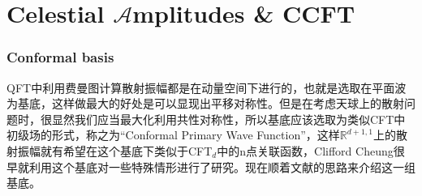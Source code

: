 \part{Celestial $\mathcal{A}$mplitudes \& CCFT}
\setcounter{theorem}{0}
\setcounter{definition}{0}
\setcounter{lemma}{0}
\setcounter{sidenote}{1}
\section{Conformal basis}
QFT中利用费曼图计算散射振幅都是在动量空间下进行的，也就是选取在平面波为基底，这样做最大的好处是可以显现出平移对称性。但是在考虑天球上的散射问题时，很显然我们应当最大化利用共性对称性，所以基底应该选取为类似CFT中初级场的形式，称之为“Conformal Primary Wave Function”，这样$\mathbb{R}^{d+1,1}$上的散射振幅就有希望在这个基底下类似于CFT$_{d}$中的n点关联函数，Clifford Cheung很早就利用这个基底对一些特殊情形进行了研究\cite{Cheung:2016iub}。现在顺着文献\cite{Pasterski:2017kqt}的思路来介绍这一组基底。

